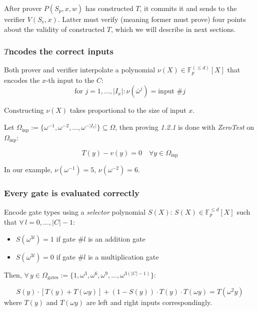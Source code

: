 \documentclass[../lecture-notes.tex]{subfiles}
\begin{document}
After prover \(P(S_p, x, w)\) has constructed \(T\), it commits it and sends to the verifier \(V(S_v, x)\). Latter must verify (meaning former must prove) four points about the validity of constructed \(T\), which we will describe in next sections.

\subsubsection{\texorpdfstring{\(T\)} encodes the correct inputs}
Both prover and verifier interpolate a polynomial \(\nu(X) \in \mathbb{F}_p^{(\leq d)}[X] \) that encodes the \(x\)-th input to the \(C\):
\[\text{for } j = 1, \dots, |I_x| : \nu(\bar{\omega}^j) = \text{input } \#j\]

\begin{remark}
Constructing \(\nu(X)\) takes proportional to the size of input \(x\).
\end{remark}

Let \(\Omega_{\text{inp}} := \{ \omega^{-1}, \omega^{-2}, ..., \omega^{-|I_x|} \} \subseteq \Omega\), then proving \textit{1.2.1} is done with \textit{ZeroTest} on \(\Omega_{\text{inp}}\):

\[T(y) - v(y) = 0 \quad \forall y \in \Omega_{\text{inp}}\]

\begin{example}
In our example, \(\nu(\omega^{-1})=5\), \(\nu(\omega^{-2})=6\).
\end{example}

\subsubsection{Every gate is evaluated correctly}

Encode gate types using a \textit{selector} polynomial \(S(X)\):
\(S(X) \in \mathbb{F}_p^{\leq d}[X]\) such that \(\forall \, l = 0, ..., |C| - 1\): 
\begin{itemize}
    \item \(S(\omega^{3l}) = 1\) if gate \(\#l\) is an addition gate 
    \item \(S(\omega^{3l}) = 0\) if gate \(\#l\) is a multiplication gate 
\end{itemize}

Then, \(\forall \, y \in \Omega_{\text{gates}} := \{ 1, \omega^3, \omega^6, \omega^9, ..., \omega^{3(|C|-1)} \}\):

\[S(y) \cdot [T(y) + T(\omega y)] + (1 - S(y)) \cdot T(y) \cdot T(\omega y) = T(\omega^2 y)\]
where \(T(y)\) and \(T(\omega y)\) are left and right inputs correspondingly.
\end{document}
